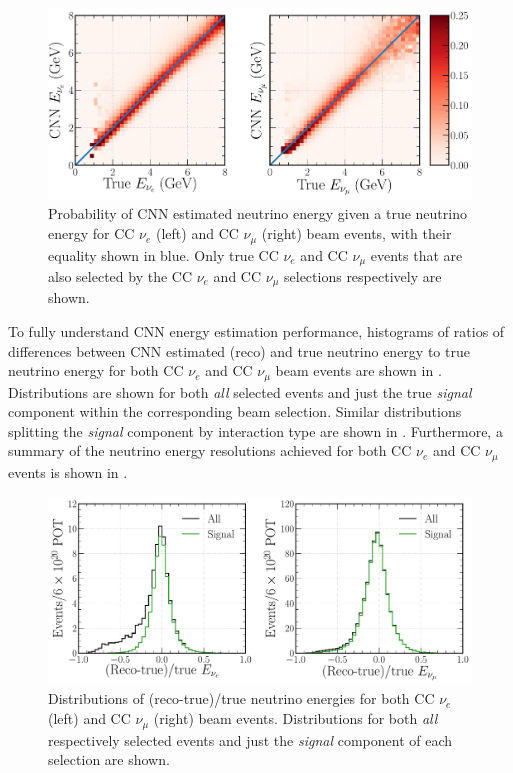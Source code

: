 \begin{figure} %
    \includegraphics[width=\textwidth]{diagrams/7-results/final_energy_2d.pdf}
    \caption[Probability of CNN estimated neutrino energy given a true neutrino energy]
    {Probability of CNN estimated neutrino energy given a true neutrino energy for CC $\nu_{e}$
        (left) and CC $\nu_{\mu}$ (right) beam events, with their equality shown in blue. Only
        true CC $\nu_{e}$ and CC $\nu_{\mu}$ events that are also selected by the CC $\nu_{e}$ and
        CC $\nu_{\mu}$ selections respectively are shown.}
    \label{fig:final_energy_2d}
\end{figure}

To fully understand CNN energy estimation performance, histograms of ratios of differences between
CNN estimated (reco) and true neutrino energy to true neutrino energy for both CC $\nu_{e}$ and CC
$\nu_{\mu}$ beam events are shown in . Distributions are shown
for both \emph{all} selected events and just the true \emph{signal} component within the
corresponding beam selection. Similar distributions splitting the \emph{signal} component by
interaction type are shown in . Furthermore, a summary of
the neutrino energy resolutions achieved for both CC $\nu_{e}$ and CC $\nu_{\mu}$ events is shown
in .

\begin{figure} %
    \includegraphics[width=\textwidth]{diagrams/7-results/final_energy_frac.pdf}
    \caption[Distributions of (reco-true)/true neutrino energies]
    {Distributions of (reco-true)/true neutrino energies for both CC $\nu_{e}$ (left) and CC
        $\nu_{\mu}$ (right) beam events. Distributions for both \emph{all} respectively selected
        events and just the \emph{signal} component of each selection are shown.}
    \label{fig:final_energy_frac}
\end{figure}

